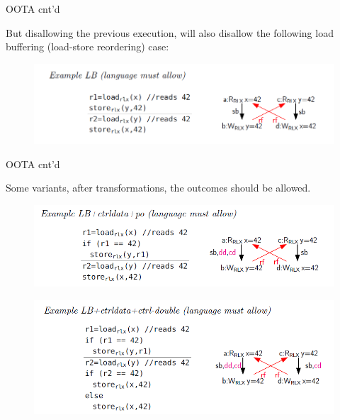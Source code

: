 \documentclass{beamer}
\begin{document}
    \begin{frame}{OOTA cnt'd}
        
        But disallowing the previous execution, will also disallow the following load buffering (load-store reordering) case:
        \begin{figure}
            \centering
            \includegraphics[scale=0.5]{LB.PNG}
        \end{figure}

    \end{frame}

    \begin{frame}{OOTA cnt'd}

        Some variants, after transformations, the outcomes should be allowed.

            
                \begin{figure}
                    \centering
                    \includegraphics[scale=0.5]{LB+Ctrl+data.PNG}
                \end{figure}

                \begin{figure}
                    \centering
                    \includegraphics[scale=0.5]{LB+Ctrldata+ctrldouble.PNG}
                \end{figure}

        
    \end{frame}
\end{document}
